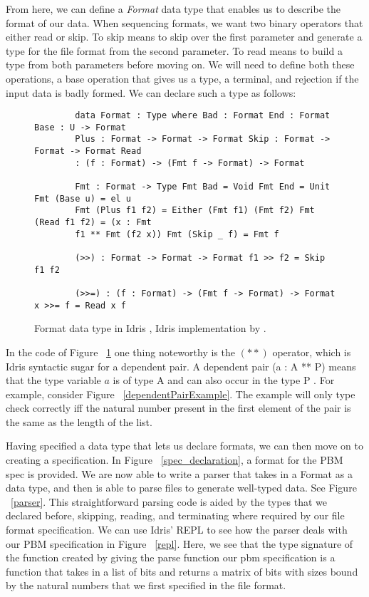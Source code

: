 From here, we can define a \textit{Format} data type that enables us to describe
the format of our data. When sequencing formats, we want two binary operators
that either read or skip. To skip means to skip over the first parameter and
generate a type for the file format from the second parameter. To read means to
build a type from both parameters before moving on. We will need to define both
these operations, a base operation that gives us a type, a terminal, and
rejection if the input data is badly formed. We can declare such a type as
follows: 

\begin{figure}[h]
    \caption{Format data type in Idris \cite{power_of_pi}, Idris implementation
    by \cite{idris_pop}.}
    \label{formatDeclaration}
    \begin{lstlisting}
        data Format : Type where Bad : Format End : Format Base : U -> Format
        Plus : Format -> Format -> Format Skip : Format -> Format -> Format Read
        : (f : Format) -> (Fmt f -> Format) -> Format

        Fmt : Format -> Type Fmt Bad = Void Fmt End = Unit Fmt (Base u) = el u
        Fmt (Plus f1 f2) = Either (Fmt f1) (Fmt f2) Fmt (Read f1 f2) = (x : Fmt
        f1 ** Fmt (f2 x)) Fmt (Skip _ f) = Fmt f

        (>>) : Format -> Format -> Format f1 >> f2 = Skip f1 f2

        (>>=) : (f : Format) -> (Fmt f -> Format) -> Format x >>= f = Read x f
    \end{lstlisting}
\end{figure}

In the code of Figure ~\ref{formatDeclaration} one thing noteworthy is the
$(**)$ operator, which is Idris syntactic sugar for a dependent pair. A
dependent pair (a : A ** P) means that the type variable $a$ is of type A and
can also occur in the type P \cite{idris_dependent_pairs}. For example, consider
Figure ~\ref{dependentPairExample}. The example will only type check correctly
iff the natural number present in the first element of the pair is the same as
the length of the list. 

Having specified a data type that lets us declare formats, we can then move on
to creating a specification. In Figure ~\ref{spec_declaration}, a format for the
PBM spec is provided. We are now able to write a parser that takes in a Format
as a data type, and then is able to parse files to generate well-typed data. See
Figure ~\ref{parser}. This straightforward parsing code is aided by the types
that we declared before, skipping, reading, and terminating where required by
our file format specification. We can use Idris' REPL to see how the parser
deals with our PBM specification in Figure ~\ref{repl}. Here, we see that the
type signature of the function created by giving the parse function our pbm
specification is a function that takes in a list of bits and returns a matrix of
bits with sizes bound by the natural numbers that we first specified in the file
format. 


